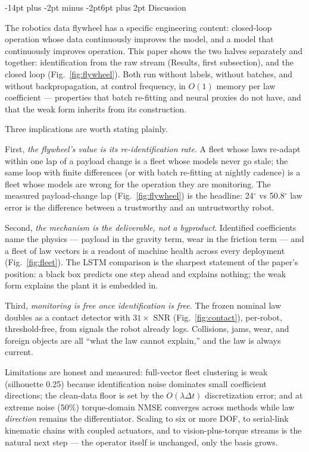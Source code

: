 \documentclass[10pt]{article}
\makeatletter
\renewcommand\section{\@startsection{section}{1}{\z@}%
  {-14pt plus -2pt minus -2pt}{6pt plus 2pt}%
  {\normalfont\bfseries\large}}
\makeatother
\begin{document}
\section{Discussion}

The robotics data flywheel has a specific engineering content: closed-loop
operation whose data continuously improves the model, and a model that
continuously improves operation. This paper shows the two halves separately
and together: identification from the raw stream (Results, first subsection),
and the closed loop (Fig.~\ref{fig:flywheel}). Both run without labels,
without batches, and without backpropagation, at control frequency, in
$O(1)$ memory per law coefficient --- properties that batch re-fitting and
neural proxies do not have, and that the weak form inherits from its
construction.

Three implications are worth stating plainly.

First, \emph{the flywheel's value is its re-identification rate}. A fleet
whose laws re-adapt within one lap of a payload change is a fleet whose
models never go stale; the same loop with finite differences (or with batch
re-fitting at nightly cadence) is a fleet whose models are wrong for the
operation they are monitoring. The measured payload-change lap
(Fig.~\ref{fig:flywheel}) is the headline: 24$^\circ$ vs 50.8$^\circ$ law
error is the difference between a trustworthy and an untrustworthy robot.

Second, \emph{the mechanism is the deliverable, not a byproduct}. Identified
coefficients name the physics --- payload in the gravity term, wear in the
friction term --- and a fleet of law vectors is a readout of machine health
across every deployment (Fig.~\ref{fig:fleet}). The LSTM comparison is the
sharpest statement of the paper's position: a black box predicts one step
ahead and explains nothing; the weak form explains the plant it is embedded
in.

Third, \emph{monitoring is free once identification is free}. The frozen
nominal law doubles as a contact detector with $31\times$ SNR
(Fig.~\ref{fig:contact}), per-robot, threshold-free, from signals the robot
already logs. Collisions, jams, wear, and foreign objects are all ``what the
law cannot explain,'' and the law is always current.

Limitations are honest and measured: full-vector fleet clustering is weak
(silhouette 0.25) because identification noise dominates small coefficient
directions; the clean-data floor is set by the $O(\lambda\Delta t)$
discretization error; and at extreme noise (50\%) torque-domain NMSE
converges across methods while law \emph{direction} remains the differentiator.
Scaling to six or more DOF, to serial-link kinematic chains with coupled
actuators, and to vision-plus-torque streams is the natural next step --- the
operator itself is unchanged, only the basis grows.
\end{document}
